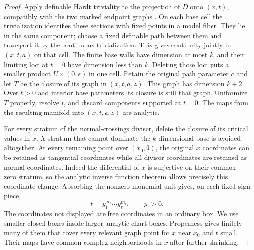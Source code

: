 \begin{proof}
Apply definable Hardt triviality to the projection of $D$ onto $(x,t)$, compatibly with the two marked endpoint graphs \cite[Theorem~5.22]{Coste1999}. On each base cell the trivialization identifies these sections with fixed points in a model fiber.  They lie in the same component; choose a fixed definable path between them and transport it by the continuous trivialization. This gives continuity jointly in $(x,t,a)$ on that cell.  The finite base walls have dimension at most $k$, and their limiting loci at $t=0$ have dimension less than $k$.  Deleting those loci puts a smaller product $U\times(0,\epsilon)$ in one cell.  Retain the original path parameter $a$ and let $T$ be the closure of its graph in $(x,t,a,z)$.  This graph has dimension $k+2$.  Over $t>0$ and interior base parameters its closure is still that graph.  Uniformize $T$ properly, resolve $t$, and discard components supported at $t=0$. The maps from the resulting manifold into $(x,t,a,z)$ are analytic.

For every stratum of the normal-crossings divisor, delete the closure of its critical values in $x$.  A stratum that cannot dominate the $k$-dimensional base is avoided altogether.  At every remaining point over $(x_0,0)$, the original $x$ coordinates can be retained as tangential coordinates while all divisor coordinates are retained as normal coordinates.  Indeed the differential of $x$ is surjective on their common zero stratum, so the analytic inverse function theorem allows precisely this coordinate change.  Absorbing the nonzero monomial unit gives, on each fixed sign piece,
\begin{equation}\label{eq:loc-monomial}
                t=y_1^{m_1}\cdots y_r^{m_r},\qquad y_i>0.
\end{equation}
The coordinates not displayed are free coordinates in an ordinary box.  We use smaller closed boxes inside larger analytic chart boxes. Properness gives finitely many of them that cover every relevant graph point for $x$ near $x_0$ and $t$ small.  Their maps have common complex neighborhoods in $x$ after further shrinking.


\end{proof}
